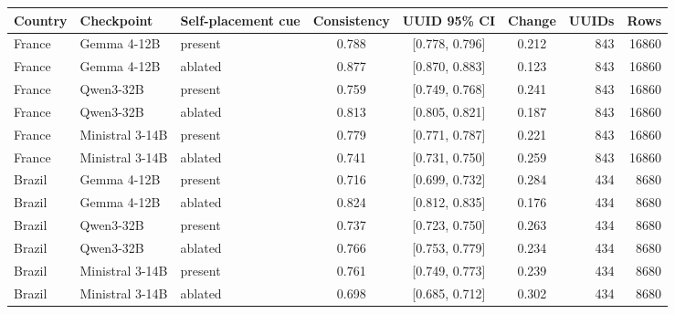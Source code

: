 \begin{tabular}{lllcccrr}
\toprule
Country & Checkpoint & Self-placement cue & Consistency & UUID 95\% CI & Change & UUIDs & Rows \\
\midrule
France & Gemma 4-12B & present & 0.788 & [0.778, 0.796] & 0.212 & 843 & 16860 \\
France & Gemma 4-12B & ablated & 0.877 & [0.870, 0.883] & 0.123 & 843 & 16860 \\
France & Qwen3-32B & present & 0.759 & [0.749, 0.768] & 0.241 & 843 & 16860 \\
France & Qwen3-32B & ablated & 0.813 & [0.805, 0.821] & 0.187 & 843 & 16860 \\
France & Ministral 3-14B & present & 0.779 & [0.771, 0.787] & 0.221 & 843 & 16860 \\
France & Ministral 3-14B & ablated & 0.741 & [0.731, 0.750] & 0.259 & 843 & 16860 \\
Brazil & Gemma 4-12B & present & 0.716 & [0.699, 0.732] & 0.284 & 434 & 8680 \\
Brazil & Gemma 4-12B & ablated & 0.824 & [0.812, 0.835] & 0.176 & 434 & 8680 \\
Brazil & Qwen3-32B & present & 0.737 & [0.723, 0.750] & 0.263 & 434 & 8680 \\
Brazil & Qwen3-32B & ablated & 0.766 & [0.753, 0.779] & 0.234 & 434 & 8680 \\
Brazil & Ministral 3-14B & present & 0.761 & [0.749, 0.773] & 0.239 & 434 & 8680 \\
Brazil & Ministral 3-14B & ablated & 0.698 & [0.685, 0.712] & 0.302 & 434 & 8680 \\
\bottomrule
\end{tabular}
